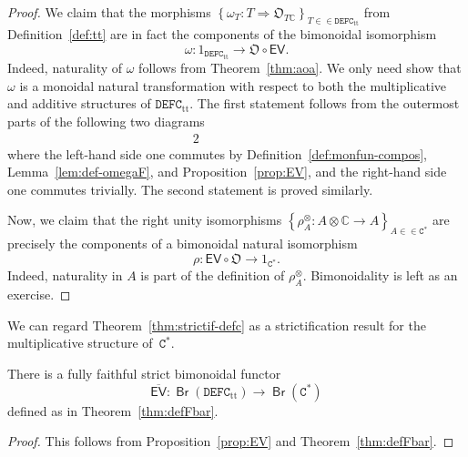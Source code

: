 \documentclass[10pt]{simplearticle}
\newcommand{\tikzinput}[1]{}
\newcommand{\DEFC}{\mathbb{\mathtt{DEFC}}}
\newcommand{\Cstar}{\mathtt{C^{*}}}
\newcommand{\mathsb}[1]{\boldsymbol{\mathsf{#1}}}
\newcommand{\Br}{\operatorname{\mathsb{Br}}}
\newcommand{\EV}{\mathsb{EV}}
\newcommand{\ttt}{\operatorname{tt}}
\begin{document}
\begin{proof}
We claim that the morphisms $\left\{ \omega_{T}\colon T\Rightarrow\mathfrak{O}_{T\mathbb{C}}\right\} _{T\in\in\DEFC_{\ttt}}$
from Definition~\ref{def:tt} are in fact the components of the bimonoidal
isomorphism
\[
\omega\colon1_{\DEFC_{\ttt}}\to\mathfrak{O}\circ\EV.
\]
 Indeed, naturality of $\omega$ follows from Theorem~\ref{thm:aoa}.
We only need show that $\omega$ is a monoidal natural transformation
with respect to both the multiplicative and additive structures of
$\DEFC_{\ttt}$. The first statement follows from the outermost parts
of the following two diagrams
\begin{alignat*}{2}
 & \tikzinput{d576} & \qquad\qquad & \tikzinput{d577}
\end{alignat*}
where the left-hand side one commutes by Definition~\ref{def:monfun-compos},
Lemma~\ref{lem:def-omegaF}, and Proposition~\ref{prop:EV}, and
the right-hand side one commutes trivially. The second statement is
proved similarly.

Now, we claim that the right unity isomorphisms $\left\{ \rho^{\otimes}_{A}\colon A\otimes\mathbb{C}\to A\right\} _{A\in\in\Cstar}$
are precisely the components of a bimonoidal natural isomorphism
\[
\rho\colon\EV\circ\mathfrak{O}\to1_{\Cstar}.
\]
Indeed, naturality in $A$ is part of the definition of $\rho^{\otimes}_{A}$.
Bimonoidality is left as an exercise.
\end{proof}

\begin{rem}\label{rem:strictif-defc}
We can regard Theorem~\ref{thm:strictif-defc}
as a strictification result for the multiplicative structure of~$\Cstar$.
\end{rem}

\begin{cor}\label{cor:EV-DEFC}
There is a fully faithful strict bimonoidal functor
\[
\overline{\EV}\colon\Br(\DEFC_{\ttt})\to\Br(\Cstar)
\]
defined as in Theorem~\ref{thm:defFbar}.
\end{cor}

\begin{proof}
This follows from Proposition~\ref{prop:EV} and Theorem~\ref{thm:defFbar}.
\end{proof}
\end{document}
